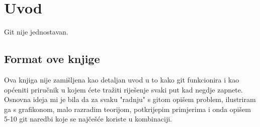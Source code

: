 \chapter*{Uvod}

Git nije jednostavan.

\section*{Format ove knjige}

Ova knjiga nije zamišljena kao detaljan uvod u to kako git funkcionira i kao općeniti priručnik u kojem ćete tražiti riješenje svaki put kad negdje zapnete.
Osnovna ideja mi je bila da za svaku "radnju" s gitom opišem problem, ilustriram ga s grafikonom, malo razradim teorijom, potkrijepim primjerima i onda opišem 5-10 git naredbi koje se najčešće koriste u kombinaciji. 
